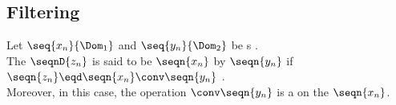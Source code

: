 \subsection{Filtering}
\begin{definition}
\label{def:filter}
\label{def:filtern}
Let $\seq{x_n}{\Dom_1}$ and $\seq{y_n}{\Dom_2}$ be s . %
\\The {} $\seqnD{z_n}$ is said to be $\seqn{x_n}$  by 
$\seqn{y_n}$ if $\seqn{z_n}\eqd\seqn{x_n}\conv\seqn{y_n}$ .
\\Moreover, in this case, the operation $\conv\seqn{y_n}$ is a  on the  $\seqn{x_n}$.
\end{definition}


